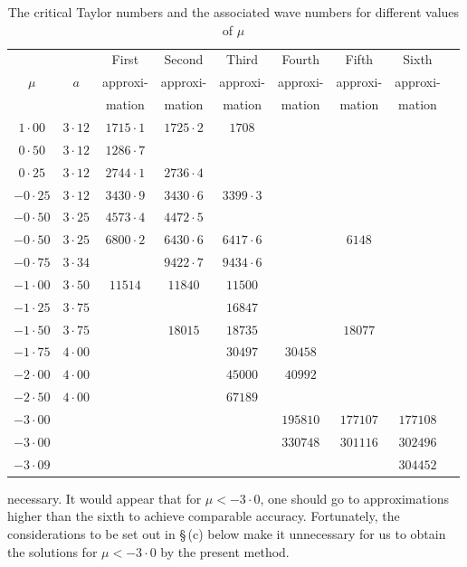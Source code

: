 \begin{table}[htbp]
\centering
\caption{The critical Taylor numbers and the associated wave numbers for different
values of $\mu$}
\label{tab:XXXII}
\begin{tabular}{ccccccccc}
\hline
& & First & Second & Third & Fourth & Fifth & Sixth \\
$\mu$ & $a$ & approxi- & approxi- & approxi- & approxi- & approxi- & approxi- \\
& & mation & mation & mation & mation & mation & mation \\
\hline
$1{\cdot}00$ & $3{\cdot}12$ & $1715{\cdot}1$ & $1725{\cdot}2$ & $1708$ & & & \\
$0{\cdot}50$ & $3{\cdot}12$ & $1286{\cdot}7$ & & & & & \\
$0{\cdot}25$ & $3{\cdot}12$ & $2744{\cdot}1$ & $2736{\cdot}4$ & & & & \\
$-0{\cdot}25$ & $3{\cdot}12$ & $3430{\cdot}9$ & $3430{\cdot}6$ & $3399{\cdot}3$ & & & \\
$-0{\cdot}50$ & $3{\cdot}25$ & $4573{\cdot}4$ & $4472{\cdot}5$ & & & & \\
$-0{\cdot}50$ & $3{\cdot}25$ & $6800{\cdot}2$ & $6430{\cdot}6$ & $6417{\cdot}6$ & & $6148$ \\
$-0{\cdot}75$ & $3{\cdot}34$ & & $9422{\cdot}7$ & $9434{\cdot}6$ & & & \\
$-1{\cdot}00$ & $3{\cdot}50$ & $11514$ & $11840$ & $11500$ & & & \\
$-1{\cdot}25$ & $3{\cdot}75$ & & & $16847$ & & & \\
$-1{\cdot}50$ & $3{\cdot}75$ & & $18015$ & $18735$ & & $18077$ & \\
$-1{\cdot}75$ & $4{\cdot}00$ & & & $30497$ & $30458$ & & \\
$-2{\cdot}00$ & $4{\cdot}00$ & & & $45000$ & $40992$ & & \\
$-2{\cdot}50$ & $4{\cdot}00$ & & & $67189$ & & & \\
$-3{\cdot}00$ & & & & & $195810$ & $177107$ & $177108$ \\
$-3{\cdot}00$ & & & & & $330748$ & $301116$ & $302496$ \\
$-3{\cdot}09$ & & & & & & & $304452$ \\
\hline
\end{tabular}
\end{table}

necessary.  It would appear that for $\mu < -3{\cdot}0$, one should go to approximations higher than the sixth to achieve comparable accuracy.  Fortunately, the considerations to be set out in \S\,(c) below make it unnecessary for us to obtain the solutions for $\mu < -3{\cdot}0$ by the present method.

